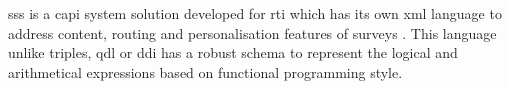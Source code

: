 
	\gls{sss} is a \gls{capi} system solution developed for \gls{rti} which has its own \gls{xml} language to address content, routing and personalisation features of surveys \cite{art:bethke08}. This language unlike \gls{triples}, \gls{qdl} or \gls{ddi} has a robust schema to represent the logical and arithmetical expressions based on functional programming style. 
